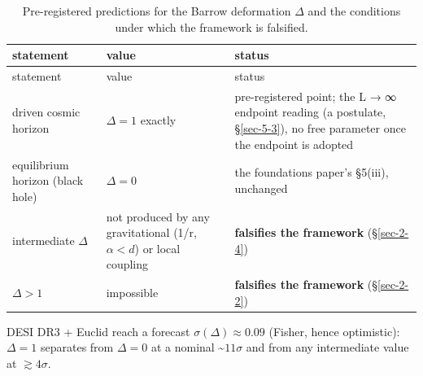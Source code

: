 \documentclass[aps,prd,preprint,nofootinbib,superscriptaddress]{revtex4-2}
\begin{document}
\begin{longtable}[]{@{}
  >{\raggedright\arraybackslash}p{}
  >{\raggedright\arraybackslash}p{}
  >{\raggedright\arraybackslash}p{}@{}}
\caption{Pre-registered predictions for the Barrow deformation
\(\Delta\) and the conditions under which the framework is
falsified.}\tabularnewline
\toprule\noalign{}
\begin{minipage}[b]{\linewidth}\raggedright
statement
\end{minipage} & \begin{minipage}[b]{\linewidth}\raggedright
value
\end{minipage} & \begin{minipage}[b]{\linewidth}\raggedright
status
\end{minipage} \\
\midrule\noalign{}
\endfirsthead
\toprule\noalign{}
\begin{minipage}[b]{\linewidth}\raggedright
statement
\end{minipage} & \begin{minipage}[b]{\linewidth}\raggedright
value
\end{minipage} & \begin{minipage}[b]{\linewidth}\raggedright
status
\end{minipage} \\
\midrule\noalign{}
\endhead
\bottomrule\noalign{}
\endlastfoot
driven cosmic horizon & \(\Delta  = 1\) exactly & pre-registered point;
the L → ∞ endpoint reading (a postulate, §\ref{sec-5-3}), no free
parameter once the endpoint is adopted \\
equilibrium horizon (black hole) & \(\Delta  = 0\) & the foundations
paper's §5(iii), unchanged \\
intermediate \(\Delta\) & not produced by any gravitational (1/r,
\(\alpha <d\)) or local coupling & \textbf{falsifies the framework}
(§\ref{sec-2-4}) \\
\(\Delta  > 1\) & impossible & \textbf{falsifies the framework}
(§\ref{sec-2-2}) \\
\end{longtable}

DESI DR3 + Euclid reach a forecast \(\sigma (\Delta ) \approx  0.09\)
(Fisher, hence optimistic): \(\Delta  = 1\) separates from
\(\Delta  = 0\) at a nominal \textasciitilde{}\(11\sigma\) and from any
intermediate value at \(\gtrsim  4\sigma\).
\end{document}
